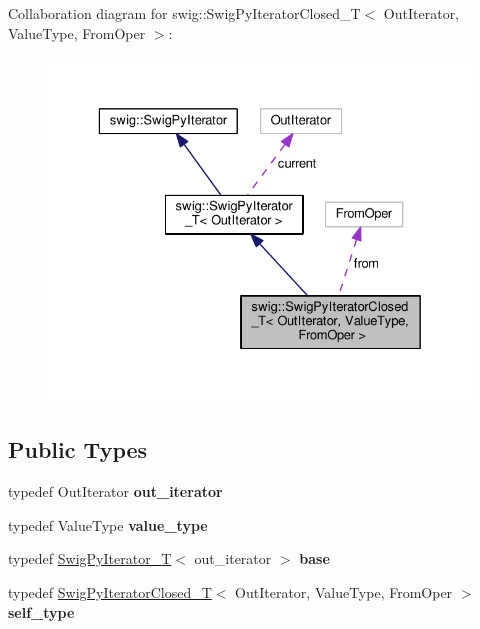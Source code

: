 Collaboration diagram for swig\+:\+:Swig\+Py\+Iterator\+Closed\+\_\+T$<$ Out\+Iterator, Value\+Type, From\+Oper $>$\+:\nopagebreak
\begin{figure}[H]
\begin{center}
\leavevmode
\includegraphics[width=329pt]{classswig_1_1SwigPyIteratorClosed__T__coll__graph}
\end{center}
\end{figure}
\subsection*{Public Types}
\begin{DoxyCompactItemize}
\item 
typedef Out\+Iterator {\bfseries out\+\_\+iterator}\hypertarget{classswig_1_1SwigPyIteratorClosed__T_ad1905c1ed0b2c2cb975788b82df5dba7}{}\label{classswig_1_1SwigPyIteratorClosed__T_ad1905c1ed0b2c2cb975788b82df5dba7}

\item 
typedef Value\+Type {\bfseries value\+\_\+type}\hypertarget{classswig_1_1SwigPyIteratorClosed__T_adff468d976862d52fa259857d5a30dba}{}\label{classswig_1_1SwigPyIteratorClosed__T_adff468d976862d52fa259857d5a30dba}

\item 
typedef \hyperlink{classswig_1_1SwigPyIterator__T}{Swig\+Py\+Iterator\+\_\+T}$<$ out\+\_\+iterator $>$ {\bfseries base}\hypertarget{classswig_1_1SwigPyIteratorClosed__T_a7a4e72c91ddb0aa9a92484d20c260ee8}{}\label{classswig_1_1SwigPyIteratorClosed__T_a7a4e72c91ddb0aa9a92484d20c260ee8}

\item 
typedef \hyperlink{classswig_1_1SwigPyIteratorClosed__T}{Swig\+Py\+Iterator\+Closed\+\_\+T}$<$ Out\+Iterator, Value\+Type, From\+Oper $>$ {\bfseries self\+\_\+type}\hypertarget{classswig_1_1SwigPyIteratorClosed__T_a37a58d5b5c7a26f9345246d781e7edd4}{}\label{classswig_1_1SwigPyIteratorClosed__T_a37a58d5b5c7a26f9345246d781e7edd4}

\end{DoxyCompactItemize}
